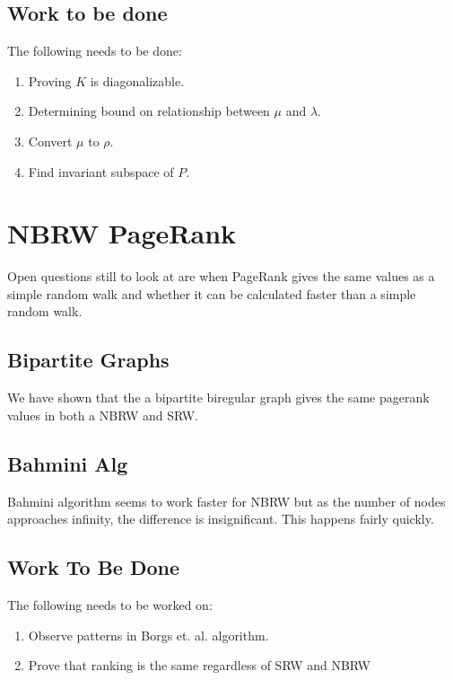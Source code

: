 \documentclass[11pt]{article}
\begin{document}
\subsection{Work to be done}

The following needs to be done:

\begin{enumerate}
\item Proving $K$ is diagonalizable.
\item Determining bound on relationship between $\mu$ and $\lambda$.\
\item Convert $\mu$ to $\rho$.
\item Find invariant subspace of $P$.
\end{enumerate}

\section{NBRW PageRank}

Open questions still to look at are when PageRank gives the same values as a simple random walk and whether it can be calculated faster than a simple random walk.

\subsection{Bipartite Graphs}

We have shown that the a bipartite biregular graph gives the same pagerank values in both a NBRW and SRW.

\subsection{Bahmini Alg}

Bahmini algorithm seems to work faster for NBRW but as the number of nodes approaches infinity, the difference is insignificant.
This happens fairly quickly.

\subsection{Work To Be Done}

The following needs to be worked on:
\begin{enumerate}
\item Observe patterns in Borgs et. al. algorithm.
\item Prove that ranking is the same regardless of SRW and NBRW
\end{enumerate}
\end{document}
